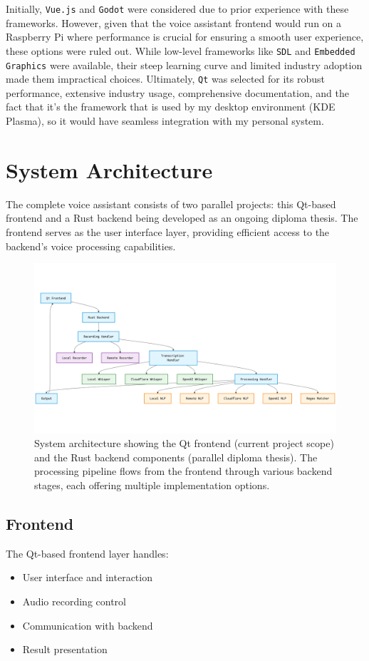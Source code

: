 Initially, \texttt{Vue.js} and \texttt{Godot} were considered due to prior experience with these frameworks. However, given that the voice assistant frontend would run on a Raspberry Pi where performance is crucial for ensuring a smooth user experience, these options were ruled out. While low-level frameworks like \texttt{SDL} and \texttt{Embedded Graphics} were available, their steep learning curve and limited industry adoption made them impractical choices. Ultimately, \texttt{Qt} was selected for its robust performance, extensive industry usage, comprehensive documentation, and the fact that it's the framework that is used by my desktop environment (KDE Plasma), so it would have seamless integration with my personal system.


\section{System Architecture}
The complete voice assistant consists of two parallel projects: this Qt-based frontend and a Rust backend being developed as an ongoing diploma thesis. The frontend serves as the user interface layer, providing efficient access to the backend's voice processing capabilities.

\begin{figure}[H]
    \centering
    \includegraphics[width=\textwidth]{assets/stackchart}
    \caption{System architecture showing the Qt frontend (current project scope) and the Rust backend components (parallel diploma thesis). The processing pipeline flows from the frontend through various backend stages, each offering multiple implementation options.}
    \label{fig:system-architecture}
\end{figure}

\subsection{Frontend}
The Qt-based frontend layer handles:
\begin{itemize}
    \item User interface and interaction
    \item Audio recording control
    \item Communication with backend
    \item Result presentation
\end{itemize}

